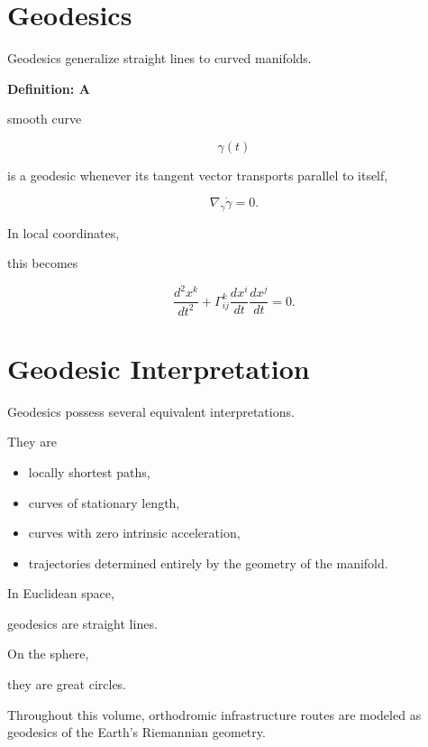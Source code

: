 \documentclass[11pt,fleqn]{book}
\numberwithin{equation}{chapter}
\newenvironment{definition}[1]
  {\begin{definitionEnv}
   \noindent\textbf{Definition: #1}\par\smallskip}
  {\end{definitionEnv}}
\theoremstyle{plain}
\theoremstyle{definition}
\theoremstyle{remark}
\begin{document}

\section{Geodesics}

Geodesics generalize straight lines to curved manifolds.


\begin{definition}

A smooth curve

\[
\gamma(t)
\]

is a geodesic whenever its tangent vector transports parallel to itself,

\[
\boxed{
\nabla_{\dot\gamma}\dot\gamma
=
0.
}
\]

\end{definition}

In local coordinates,

this becomes

\[
\boxed{
\frac{d^2x^k}{dt^2}
+
\Gamma^k_{ij}
\frac{dx^i}{dt}
\frac{dx^j}{dt}
=
0.
}
\]


\section{Geodesic Interpretation}

Geodesics possess several equivalent interpretations.

They are

\begin{itemize}
\item locally shortest paths,
\item curves of stationary length,
\item curves with zero intrinsic acceleration,
\item trajectories determined entirely by the geometry of the manifold.
\end{itemize}

In Euclidean space,

geodesics are straight lines.

On the sphere,

they are great circles.

Throughout this volume, orthodromic infrastructure routes are modeled as
geodesics of the Earth's Riemannian geometry.
\end{document}
